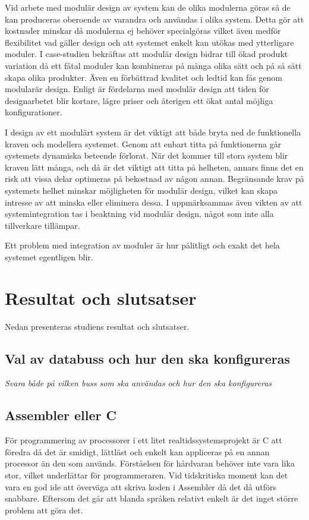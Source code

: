 \documentclass[11pt]{article}
\begin{document}
\begin{flushleft}
Vid arbete med modulär design av system kan de olika modulerna göras så de kan produceras oberoende av varandra och användas i olika system. Detta gör att kostnader minskar då modulerna ej behöver specialgöras vilket även medför flexibilitet vad gäller design och att systemet enkelt kan utökas med ytterligare moduler.\cite{ReMoRo} I case-studien \cite{MMPD} bekräftas att modulär design bidrar till ökad produkt variation då ett fåtal moduler kan kombineras på många olika sätt och på så sätt skapa olika produkter. Även en förbättrad kvalitet och ledtid kan fås genom modularär design. Enligt \cite{MRDCRD} är fördelarna med modulär design att tiden för designarbetet blir kortare, lägre priser och återigen ett ökat antal möjliga konfigurationer. 

I design av ett modulärt system är det viktigt att både bryta ned de funktionella kraven och modellera systemet. Genom att enbart titta på funktionerna går systemets dynamiska beteende förlorat. När det kommer till stora system blir kraven lätt många, och då är det viktigt att titta på helheten, annars finns det en risk att vissa delar optimeras på bekostnad av någon annan. Begränsande krav på systemets helhet minskar möjligheten för modulär design, vilket kan skapa intresse av att minska eller eliminera dessa. \cite{Modules} I \cite{MMPD} uppmärksammas även vikten av att systemintegration tas i beaktning vid modulär design, något som inte alla tillverkare tillämpar. 

Ett problem med integration av moduler är hur pålitligt och exakt det hela systemet egentligen blir. \cite{DIMRS}

\pagebreak

\section{Resultat och slutsatser}
Nedan presenteras studiens resultat och slutsatser.

\subsection{Val av databuss och hur den ska konfigureras}
\textit{Svara både på vilken buss som ska användas och hur den ska konfigureras}

\subsection{Assembler eller C}

För programmering av processorer i ett litet realtidssystemsprojekt är C att föredra då det är smidigt, lättläst och enkelt kan appliceras på en annan processor än den som används. Förståelsen för hårdvaran behöver inte vara lika stor, vilket underlättar för programmeraren. Vid tidskritiska moment kan det vara en god ide att överväga att skriva koden i Assembler då det då utförs snabbare. Eftersom det går att blanda språken relativt enkelt är det inget större problem att göra det.


\end{flushleft}
\end{document}
